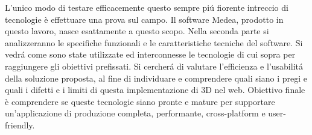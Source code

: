 L'unico modo di testare efficacemente questo sempre pi\'{u} fiorente intreccio di tecnologie \`{e} effettuare una prova sul campo. Il software Medea, prodotto in questo lavoro, nasce esattamente a questo scopo. Nella seconda parte si analizzeranno le specifiche funzionali e le caratteristiche tecniche del software. Si vedr\'{a} come sono state utilizzate ed interconnesse le tecnologie di cui sopra per raggiungere gli obiettivi prefissati. Si cercher\'{a} di valutare l'efficienza e l'usabilit\'{a} della soluzione proposta, al fine di individuare e comprendere quali siano i pregi e quali i difetti e i limiti di questa implementazione di 3D nel web. Obiettivo finale \`{e} comprendere se queste tecnologie siano pronte e mature per supportare un'applicazione di produzione completa, performante, cross-platform e user-friendly.
